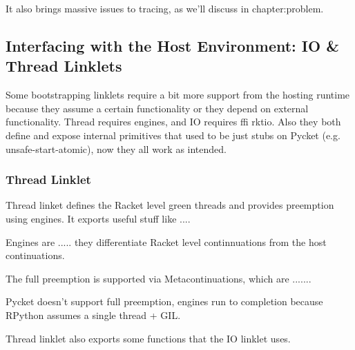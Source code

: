 			\begin{paragraph-here}%
				It also brings massive issues to tracing, as we'll discuss in chapter:problem.
			\end{paragraph-here}

		\subsection{Interfacing with the Host Environment: IO \& Thread Linklets}

			\begin{paragraph-here}%
				Some bootstrapping linklets require a bit more support from the hosting runtime because they assume a certain functionality or they depend on external functionality. Thread requires engines, and IO requires ffi rktio. Also they both define and expose internal primitives that used to be just stubs on Pycket (e.g. unsafe-start-atomic), now they all work as intended.
			\end{paragraph-here}

			\subsubsection{Thread Linklet}

				\begin{paragraph-here}%
					Thread linket defines the Racket level green threads and provides preemption using engines. It exports useful stuff like ....
				\end{paragraph-here}

				\begin{paragraph-here}%
					Engines are ..... they differentiate Racket level continnuations from the host continuations.
				\end{paragraph-here}

				\begin{paragraph-here}%
					The full preemption is supported via Metacontinuations, which are .......
				\end{paragraph-here}

				\begin{paragraph-here}%
					Pycket doesn't support full preemption, engines run to completion because RPython assumes a single thread + GIL.
				\end{paragraph-here}

				\begin{paragraph-here}%
					Thread linklet also exports some functions that the IO linklet uses.
				\end{paragraph-here}

